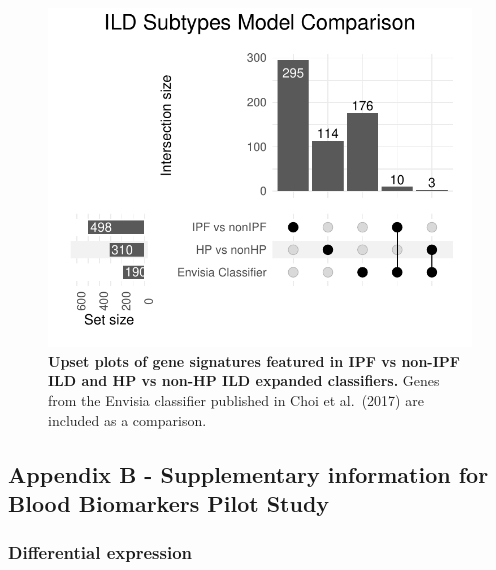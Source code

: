 \documentclass[
]{article}
\begin{document}
\begin{figure}

{\centering \includegraphics[width=0.6\linewidth,]{./Figures/SysReview/FigE10_Envisia} 

}

\caption[Envisia comparison]{\textbf{Upset plots of gene signatures featured in IPF vs non-IPF ILD and HP vs non-HP ILD expanded classifiers.} Genes from the Envisia classifier published in Choi et al.~(2017) are included as a comparison.}\label{fig:envisia}
\end{figure}

\clearpage

\subsection{Appendix B - Supplementary information for Blood Biomarkers Pilot Study}\label{appendix-b---supplementary-information-for-blood-biomarkers-pilot-study}

\renewcommand{\thefigure}{A3.\arabic{figure}}
\setcounter{figure}{0}
\renewcommand{\thetable}{A3.\arabic{table}}
\setcounter{table}{0}
\renewcommand{\theequation}{A3.\arabic{equation}}
\setcounter{equation}{0}

\captionsetup{width=6.5in}

\subsubsection{Differential expression}\label{differential-expression}
\end{document}

